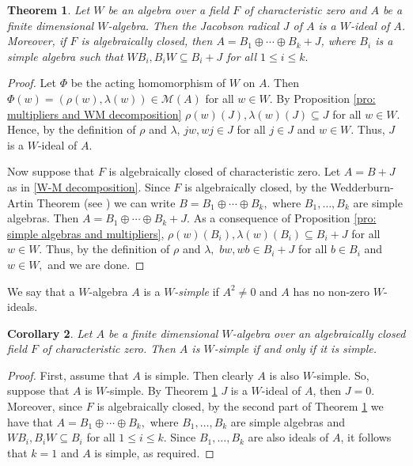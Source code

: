 \documentclass[reqno]{amsart}
\newtheorem{theorem}{Theorem}
\newtheorem{corollary}[theorem]{Corollary}
\theoremstyle{definition}
\numberwithin{equation}{section}
\numberwithin{theorem}{section}
\newcommand{\M}{\mathcal{M}}
\begin{document}
\begin{theorem}\label{thm: WM decomposizion W-alg}
    Let $W$ be an algebra over a field $F$ of characteristic zero and $A$ be a finite dimensional $W$-algebra. Then the Jacobson radical $J$ of $A$ is a $W$-ideal of $A$. Moreover, if $F$ is algebraically closed, then $A=B_1\oplus \cdots\oplus B_k+J$, where $B_i$ is a simple algebra such that $WB_i, B_i  W \subseteq B_i+J$ for all $1\leq i \leq k.$
\end{theorem}
\begin{proof}
    Let $\Phi$ be the acting homomorphism of $W$ on $A$. Then $\Phi(w)=(\rho(w),\lambda(w))\in \M(A)$ for all $w\in W$. By Proposition \ref{pro: multipliers and WM decomposition}
 $\rho(w)(J), \lambda(w)(J)\subseteq J$ for all $w\in W$. Hence, by the definition of $\rho$ and $\lambda$, $jw, wj\in J$ for all $j\in J$ and $w\in W$. Thus, $J$ is a $W$-ideal of $A$.

 Now suppose that $F$ is algebraically closed of characteristic zero. Let $A=B+J$ as in \eqref{W-M decomposition}. Since $F$ is algebraically closed, by the Wedderburn-Artin Theorem (see \cite[Theorem 2.1.6]{Herstein1968}) we can write  $B=B_1 \oplus \cdots \oplus B_k,$ where $B_1, \ldots, B_k$ are simple algebras.
  Then
  $
  A=B_1 \oplus \cdots \oplus B_k+J.
  $
 As a consequence of Proposition \ref{pro: simple algebras and multipliers}, $\rho(w)(B_i), \lambda(w)(B_i)\subseteq B_i+J$ for all $w\in W.$ Thus, by the definition of $\rho$ and $\lambda,$ $bw, wb\in B_i+J$ for all $b\in B_i$ and $w\in W,$ and we are done.
\end{proof}

We say that a $W$-algebra $A$ is a \emph{$W$-simple} if $A^2\neq 0$ and $A$ has no non-zero $W$-ideals.

\begin{corollary}\label{cor: W-simple and simple algebras}
    Let %
    $A$ be a finite dimensional $W$-algebra over an algebraically closed field $F$ of characteristic zero.
    Then $A$ is $W$-simple if and only if it is simple.
\end{corollary}
\begin{proof}
    First, assume that $A$ is simple. Then clearly $A$ is also $W$-simple. So, suppose that $A$ is $W$-simple. By Theorem \ref{thm: WM decomposizion W-alg} $J$ is a $W$-ideal of $A$, then $J=0$. 
    Moreover, since $F$ is algebraically closed, by the second part of Theorem \ref{thm: WM decomposizion W-alg}
  we have that $A=B_1 \oplus \cdots \oplus B_k,$ where $B_1, \ldots, B_k$ are simple algebras and 
    $WB_i, B_i W \subseteq B_i$ for all $1\leq i \leq k$. Since $B_1, \ldots, B_k$ are also ideals of $A$, it follows that $k=1$ and $A$ is simple, as required.
\end{proof}
\end{document}
